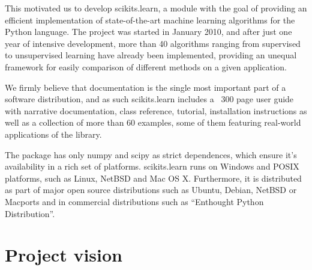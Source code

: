 \documentclass[twoside,11pt]{article}
\begin{document}


This motivated us to develop scikits.learn, a module with the goal of
providing an efficient implementation of state-of-the-art machine
learning algorithms for the Python language. The project was started
in January 2010, and after just one year of intensive development,
more than 40 algorithms ranging from supervised to unsupervised
learning have already been implemented, providing an unequal framework
for easily comparison of different methods on a given application.

We firmly believe that documentation is the single most important part
of a software distribution, and as such scikits.learn includes a ~300
page user guide with narrative documentation, class reference,
tutorial, installation instructions as well as a collection of more
than 60 examples, some of them featuring real-world applications of
the library.


The package has only numpy and scipy as strict dependences, which
ensure it's availability in a rich set of platforms. scikits.learn
runs on Windows and POSIX platforms, such as Linux, NetBSD and Mac OS
X. Furthermore, it is distributed as part of major open source
distributions such as Ubuntu, Debian, NetBSD or Macports and in
commercial distributions such as ``Enthought Python Distribution''.


\section{Project vision}
\end{document}
